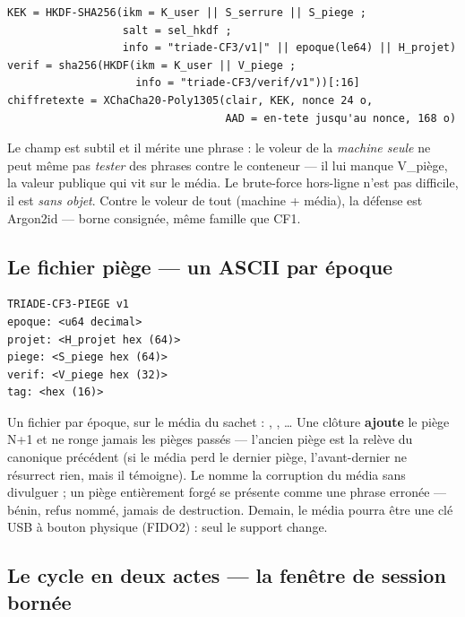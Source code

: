 \begin{lstlisting}
KEK = HKDF-SHA256(ikm = K_user || S_serrure || S_piege ;
                  salt = sel_hkdf ;
                  info = "triade-CF3/v1|" || epoque(le64) || H_projet)
verif = sha256(HKDF(ikm = K_user || V_piege ;
                    info = "triade-CF3/verif/v1"))[:16]
chiffretexte = XChaCha20-Poly1305(clair, KEK, nonce 24 o,
                                  AAD = en-tete jusqu'au nonce, 168 o)
\end{lstlisting}

Le champ  est subtil et il mérite une phrase : le voleur de la
\emph{machine seule} ne peut même pas \emph{tester} des phrases contre le conteneur —
il lui manque V\_piège, la valeur publique qui vit sur le média. Le brute-force
hors-ligne n'est pas difficile, il est \emph{sans objet}. Contre le voleur de tout
(machine + média), la défense est Argon2id — borne consignée, même famille que CF1.

\subsection{Le fichier piège — un ASCII par époque}

\begin{lstlisting}
TRIADE-CF3-PIEGE v1
epoque: <u64 decimal>
projet: <H_projet hex (64)>
piege: <S_piege hex (64)>
verif: <V_piege hex (32)>
tag: <hex (16)>
\end{lstlisting}

Un fichier par époque, sur le média du sachet : ,
, \ldots{} Une clôture \textbf{ajoute} le piège N+1 et ne ronge jamais
les pièges passés — l'ancien piège est la relève du canonique précédent (si le média
perd le dernier piège, l'avant-dernier ne résurrect rien, mais il témoigne). Le
 nomme la corruption du média sans divulguer ; un piège entièrement forgé se
présente comme une phrase erronée — bénin, refus nommé, jamais de destruction. Demain,
le média pourra être une clé USB à bouton physique (FIDO2) : seul le support change.

\subsection{Le cycle en deux actes — la fenêtre de session bornée}\label{sec:deuxactes}

